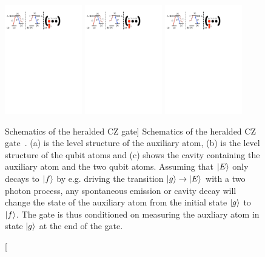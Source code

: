 \begin{figure}
\centering
\includegraphics[width=0.3\textwidth]{./figs_Borregaard_PRA2015/figure3a}
\includegraphics[width=0.3\textwidth]{./figs_Borregaard_PRA2015/figure3b}
\includegraphics[width=0.3\textwidth]{./figs_Borregaard_PRA2015/figure3c}
\caption
[Schematics of the heralded CZ gate]
{ Schematics of the heralded CZ gate~\cite{Borregaard2015a}. (a) is the level
structure of the auxiliary atom, (b) is the level structure of the qubit atoms
and (c) shows the cavity containing the auxiliary atom and the two qubit atoms.
Assuming that $| E \rangle$ only decays to $| f \rangle$ by e.g. driving the transition
$| g \rangle\to| E \rangle$ with a two photon process, any spontaneous emission or
cavity decay will change the state of the auxiliary atom from the initial state
$| g \rangle$ to $| f \rangle$. The gate is thus conditioned on measuring the auxliary
atom in state $| g \rangle$ at the end of the gate.}
\label{fig:figure3}
\end{figure}

